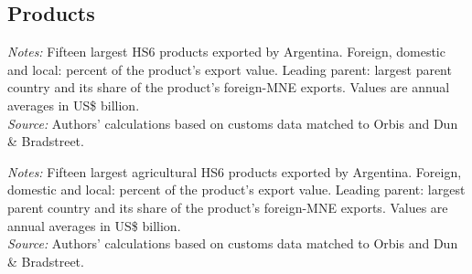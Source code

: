 \documentclass[11pt,a4paper]{article}
\begin{document}
\subsection{Products}
\begin{table}[H]\centering\footnotesize%
  \caption{Argentina: Fifteen Largest Export Products}%
  \label{tab:c_hs6_ARG}%
  \par\vspace{3pt}%
  \begin{minipage}{0.95\textwidth}\footnotesize %
  \textit{Notes:} Fifteen largest HS6 products exported by Argentina. Foreign, domestic and local: percent of the product's export value. Leading parent: largest parent country and its share of the product's foreign-MNE exports. Values are annual averages in US\$ billion.\\[3pt]%
  \textit{Source:} Authors' calculations based on customs data matched to Orbis and Dun \& Bradstreet.%
  \end{minipage}%
  \end{table}
\begin{table}[H]\centering\footnotesize%
  \caption{Argentina, Agriculture: Fifteen Largest Export Products}%
  \label{tab:c_hs6_ARG_agro}%
  \par\vspace{3pt}%
  \begin{minipage}{0.95\textwidth}\footnotesize %
  \textit{Notes:} Fifteen largest agricultural HS6 products exported by Argentina. Foreign, domestic and local: percent of the product's export value. Leading parent: largest parent country and its share of the product's foreign-MNE exports. Values are annual averages in US\$ billion.\\[3pt]%
  \textit{Source:} Authors' calculations based on customs data matched to Orbis and Dun \& Bradstreet.%
  \end{minipage}%
  \end{table}
\end{document}
